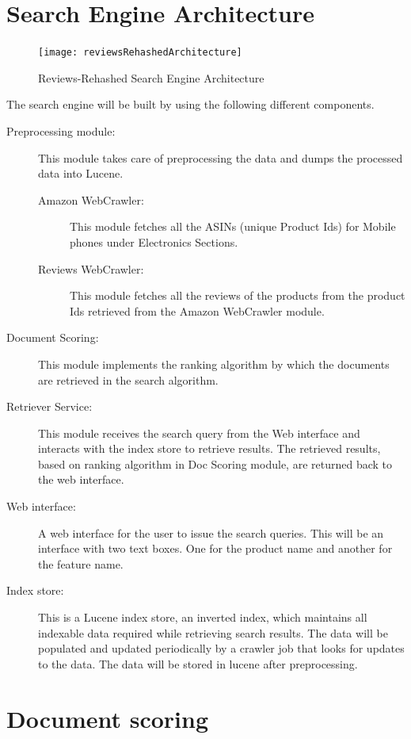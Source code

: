 \documentclass{article}
\begin{document}
\section{Search Engine Architecture}
\begin{figure}[ht!]
  \centering
  \texttt{[image: reviewsRehashedArchitecture]}
  \caption{Reviews-Rehashed Search Engine Architecture\label{fig:Search_Engine}}
\end{figure}
The search engine will be built by using the following different components.
\begin{description}
  \item[Preprocessing module: ]  This module takes care of preprocessing the data and dumps the processed data into Lucene.
  \begin{description}
	 \item[Amazon WebCrawler:] This module fetches all the ASINs (unique Product Ids) for Mobile phones under Electronics Sections.
	 \item[Reviews WebCrawler:] This module fetches all the reviews of the products from the product Ids retrieved from the Amazon WebCrawler module.
  \end{description}
  \item[Document Scoring: ] This module implements the ranking algorithm by which the documents are retrieved in the search algorithm.
  \item[Retriever Service: ] This module receives the search query from the Web interface and interacts with the index store to retrieve results. The retrieved results, based on ranking algorithm in Doc Scoring module, are returned back to the web interface.
  \item[Web interface:] A web interface for the user to issue the search queries.  This will be an interface with two text boxes. One for the product name and another for the feature name.
  \item[Index store:]  This is a Lucene index store, an inverted index, which maintains all indexable data required while retrieving search results.  The data will be populated and updated periodically by a crawler job that looks for updates to the data.  The data will be stored in lucene after preprocessing.
\end{description}

\section{Document scoring}
\end{document}

